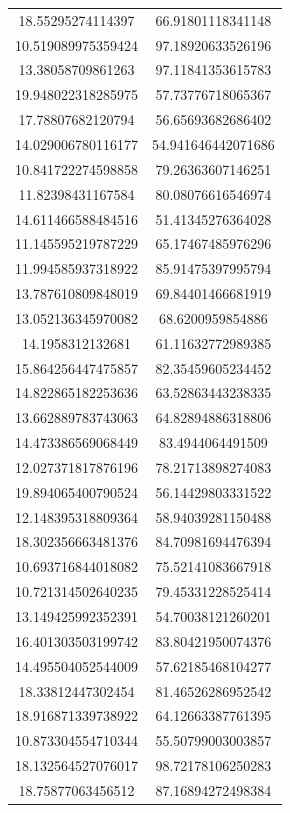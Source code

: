 \begin{table}
\begin{tabular}{cc}
18.55295274114397 & 66.91801118341148 \\
10.519089975359424 & 97.18920633526196 \\
13.38058709861263 & 97.11841353615783 \\
19.948022318285975 & 57.73776718065367 \\
17.78807682120794 & 56.65693682686402 \\
14.029006780116177 & 54.941646442071686 \\
10.841722274598858 & 79.26363607146251 \\
11.82398431167584 & 80.08076616546974 \\
14.611466588484516 & 51.41345276364028 \\
11.145595219787229 & 65.17467485976296 \\
11.994585937318922 & 85.91475397995794 \\
13.787610809848019 & 69.84401466681919 \\
13.052136345970082 & 68.6200959854886 \\
14.1958312132681 & 61.11632772989385 \\
15.864256447475857 & 82.35459605234452 \\
14.822865182253636 & 63.52863443238335 \\
13.662889783743063 & 64.82894886318806 \\
14.473386569068449 & 83.4944064491509 \\
12.027371817876196 & 78.21713898274083 \\
19.894065400790524 & 56.14429803331522 \\
12.148395318809364 & 58.94039281150488 \\
18.302356663481376 & 84.70981694476394 \\
10.693716844018082 & 75.52141083667918 \\
10.721314502640235 & 79.45331228525414 \\
13.149425992352391 & 54.70038121260201 \\
16.401303503199742 & 83.80421950074376 \\
14.495504052544009 & 57.62185468104277 \\
18.33812447302454 & 81.46526286952542 \\
18.916871339738922 & 64.12663387761395 \\
10.873304554710344 & 55.50799003003857 \\
18.132564527076017 & 98.72178106250283 \\
18.75877063456512 & 87.16894272498384 \\

\end{tabular}
\end{table}
